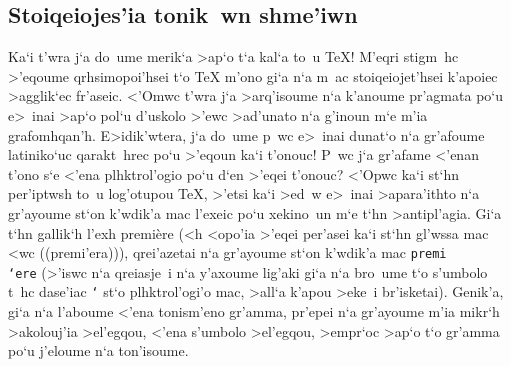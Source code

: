 \toindex{\lb}
\toindex{\rb}
\toindex{\%}
\toindex{\&}
\toindex{\~{}}
\toindex{\$}
\toindex{\^{}}
\toindex{\_{}}
\toindex{\#}


\subsection{Stoiqeiojes'ia tonik~wn shme'iwn}

Ka`i t'wra j`a do~ume merik`a >ap`o t`a kal`a to~u {\rm    \TeX}\null! 
M'eqri stig\-m~hc >'eqoume qrhsimo\-poi'hsei t`o {\rm \TeX} m'ono gi`a
n`a m~ac stoiqeiojet'hsei k'apoiec >agglik`ec fr'aseic.  <'Omwc t'wra
j`a >arq'isoume n`a k'anoume pr'agmata po`u e>~inai >ap`o pol`u d'uskolo
>'ewc >ad'unato n`a g'inoun m`e m'ia grafo\-mhqan'h.  E>idik'wtera, j`a
do~ume p~wc e>~inai dunat`o n`a gr'afoume lati\-niko`uc qara\-kt~hrec
po`u >'eqoun ka`i t'onouc!  P~wc j`a gr'afame <'enan t'ono s`e <'ena
plh\-ktro\-l'ogio po`u d`en >'eqei t'onouc?  <'Opwc ka`i st`hn
per'iptwsh to~u log'otupou {\rm \TeX}, >'etsi ka`i >ed~w e>~inai
>apara'i\-thto n`a gr'ayoume st`on k'wdik'a mac l'exeic po`u xekino~un
m`e t`hn >anti\-pl'agia.  Gi`a t`hn gallik`h  l'exh {\rm premi\`{e}re}
(<h <opo'ia >'eqei per'asei ka`i st`hn gl'wssa mac <wc ((premi'era)){}),
qrei'azetai n`a gr'ayoume st`on k'wdik'a mac    {\tt premi\\`ere}
(>'iswc n`a qreiasje~i n`a y'axoume lig'aki gi`a n`a bro~ume t`o
s'umbolo t~hc dase'iac {\tt `} st`o plhktrol'ogi'o mac, >all`a k'apou
>eke~i br'isketai).  Genik'a,
gi`a n`a l'aboume <'ena toni\-sm'e\-no gr'amma, pr'epei n`a gr'ayoume m'ia
mikr`h >ako\-lou\-j'ia >el'egqou, <'ena s'umbolo >el'egqou, >empr`oc
>ap`o t`o gr'amma po`u j'eloume n`a ton'isoume.

